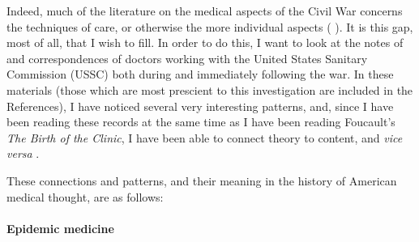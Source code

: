 \documentclass{report}
\begin{document}
  Indeed, much of the literature on the medical aspects of the Civil War concerns the techniques of care, or otherwise the more individual aspects 
  (\citeauthor{Devine2016} ). It is this gap, most of all, that I wish to fill. In order to do this, I want to look at the notes of and
  correspondences of doctors working with the United States Sanitary Commission (USSC) both during and immediately following the war. In these materials 
  (those which are most prescient to this investigation are included in the References), I have noticed several very interesting patterns, and, since I have
  been reading these records at the same time as I have been reading Foucault's \textit{The Birth of the Clinic}, I have been able to connect theory to
  content, and \textit{vice versa} \autocite{Foucault1994}.

  These connections and patterns, and their meaning in the history of American medical thought, are as follows:
  \paragraph{Epidemic medicine}\label{par:epidemic_medicine} %
  

  \newpage
  \nocite{*}
  \printbibliography
\end{document}
